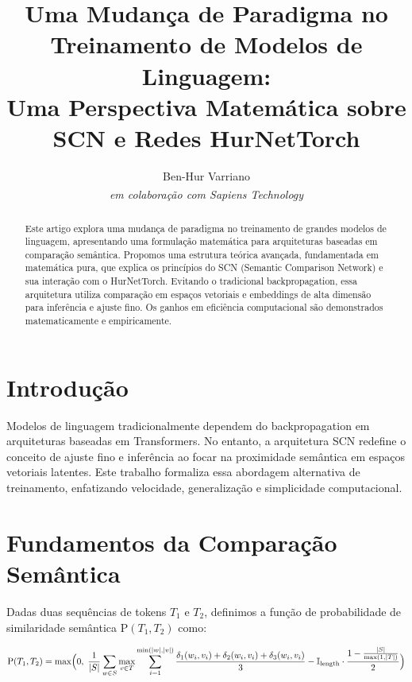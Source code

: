 \documentclass[11pt]{article}
\title{Uma Mudança de Paradigma no Treinamento de Modelos de Linguagem:\\
Uma Perspectiva Matemática sobre SCN e Redes HurNetTorch}
\author{Ben-Hur Varriano\\\textit{em colaboração com Sapiens Technology\textsuperscript{\textregistered}}}
\date{}
\begin{document}
\maketitle

\begin{abstract}
Este artigo explora uma mudança de paradigma no treinamento de grandes modelos de linguagem, apresentando uma formulação matemática para arquiteturas baseadas em comparação semântica. Propomos uma estrutura teórica avançada, fundamentada em matemática pura, que explica os princípios do SCN (Semantic Comparison Network) e sua interação com o HurNetTorch. Evitando o tradicional backpropagation, essa arquitetura utiliza comparação em espaços vetoriais e embeddings de alta dimensão para inferência e ajuste fino. Os ganhos em eficiência computacional são demonstrados matematicamente e empiricamente.
\end{abstract}

\newpage
\tableofcontents

\newpage

\section{Introdução}
Modelos de linguagem tradicionalmente dependem do backpropagation em arquiteturas baseadas em Transformers. No entanto, a arquitetura SCN redefine o conceito de ajuste fino e inferência ao focar na proximidade semântica em espaços vetoriais latentes. Este trabalho formaliza essa abordagem alternativa de treinamento, enfatizando velocidade, generalização e simplicidade computacional.

\section{Fundamentos da Comparação Semântica}
Dadas duas sequências de tokens $T_1$ e $T_2$, definimos a função de probabilidade de similaridade semântica $\text{P}(T_1, T_2)$ como:

\begin{equation}
\label{eq:probability_function}
\begin{aligned}
\text{P}(T_1, T_2) = \max\Bigl(0,\;
\frac{1}{|S|} \sum_{w \in S} \max_{v \in T}
\sum_{i=1}^{\min(|w|, |v|)} \frac{
\delta_1(w_i, v_i) + \delta_2(w_i, v_i) + \delta_3(w_i, v_i)
}{3}
- \mathbb{I}_{\text{length}} \cdot \frac{1 - \frac{|S|}{\max(1, |T|)}}{2}
\Bigr)
\end{aligned}
\end{equation}
\end{document}
